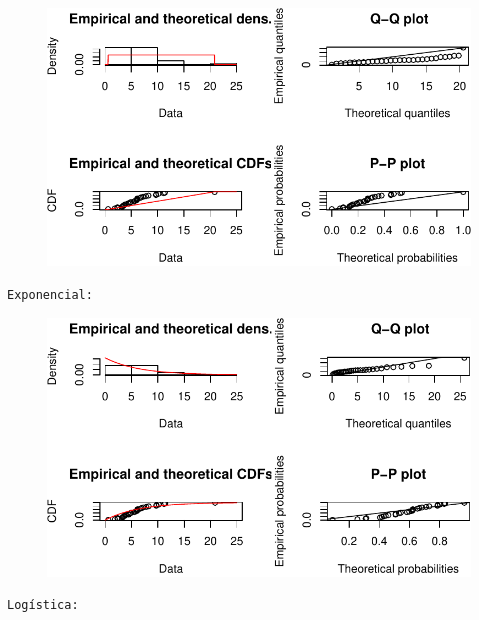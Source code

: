 \documentclass[
  letterpaper,
  DIV=11,
  numbers=noendperiod]{scrartcl}
\begin{document}
\begin{figure}[H]

{\centering \includegraphics{quiz5_files/figure-pdf/unnamed-chunk-31-7.pdf}

}

\end{figure}

\begin{verbatim}
Exponencial: 
\end{verbatim}

\begin{figure}[H]

{\centering \includegraphics{quiz5_files/figure-pdf/unnamed-chunk-31-8.pdf}

}

\end{figure}

\begin{verbatim}
Logística: 
\end{verbatim}
\end{document}
